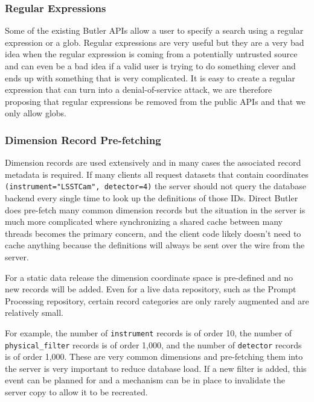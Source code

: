 \subsubsection{Regular Expressions}\label{regular-expressions}

Some of the existing Butler APIs allow a user to specify a search using a regular expression or a glob.
Regular expressions are very useful but they are a very bad idea when the regular expression is coming from a potentially untrusted source and can even be a bad idea if a valid user is trying to do something clever and ends up with something that is very complicated.
It is easy to create a regular expression that can turn into a denial-of-service attack, we are therefore proposing that regular expressions be removed from the public APIs and that we only allow globs.

\subsubsection{Dimension Record Pre-fetching}\label{dimension-record-pre-fetching}

Dimension records are used extensively and in many cases the associated record metadata is required.
If many clients all request datasets that contain coordinates \texttt{(instrument="LSSTCam", detector=4)} the server should not query the database backend every single time to look up the definitions of those IDs.
Direct Butler does pre-fetch many common dimension records but the situation in the server is much more complicated where synchronizing a shared cache between many threads becomes the primary concern, and the client code likely doesn't need to cache anything because the definitions will always be sent over the wire from the server.

For a static data release the dimension coordinate space is pre-defined and no new records will be added.
Even for a live data repository, such as the Prompt Processing repository, certain record categories are only rarely augmented and are relatively small.

For example, the number of \texttt{instrument} records is of order 10, the number of \texttt{physical\_filter} records is of order 1,000, and the number of \texttt{detector} records is of order 1,000.
These are very common dimensions and pre-fetching them into the server is very important to reduce database load.
If a new filter is added, this event can be planned for and a mechanism can be in place to invalidate the server copy to allow it to be recreated.

